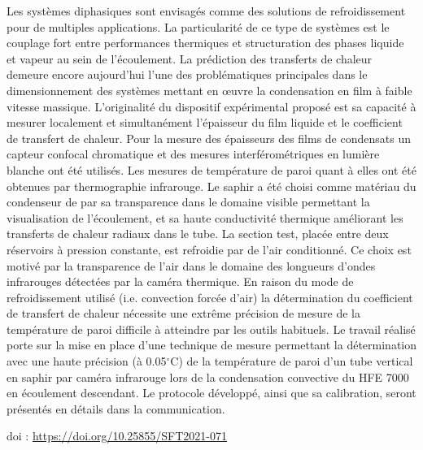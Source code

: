 {\normalsize
Les systèmes diphasiques sont envisagés comme des solutions de refroidissement pour de multiples applications. La particularité de ce type de systèmes est le couplage fort entre performances thermiques et structuration des phases liquide et vapeur au sein de l'écoulement. La prédiction des transferts de chaleur demeure encore aujourd'hui l'une des problématiques principales dans le dimensionnement des systèmes mettant en œuvre la condensation en film à faible vitesse massique. L'originalité du dispositif expérimental proposé est sa capacité à mesurer localement et simultanément l'épaisseur du film liquide et le coefficient de transfert de chaleur. Pour la mesure des épaisseurs des films de condensats un capteur confocal chromatique et des mesures interférométriques en lumière blanche ont été utilisés. Les mesures de température de paroi quant à elles ont été obtenues par thermographie infrarouge. Le saphir a été choisi comme matériau du condenseur de par sa transparence dans le domaine visible permettant la visualisation de l'écoulement, et sa haute conductivité thermique améliorant les transferts de chaleur radiaux dans le tube. La section test, placée entre deux réservoirs à pression constante, est refroidie par de l'air conditionné. Ce choix est motivé par la transparence de l'air dans le domaine des longueurs d'ondes infrarouges détectées par la caméra thermique. En raison du mode de refroidissement utilisé (i.e. convection forcée d'air) la détermination du coefficient de transfert de chaleur nécessite une extrême précision de mesure de la température de paroi difficile à atteindre par les outils habituels. Le travail réalisé porte sur la mise en place d'une technique de mesure permettant la détermination avec une haute précision (à 0.05$^{\circ}$C) de la température de paroi d'un tube vertical en saphir par caméra infrarouge lors de la condensation convective du HFE 7000 en écoulement descendant. Le protocole développé, ainsi que sa calibration, seront présentés en détails dans la communication.

 \vfill doi : \url{https://doi.org/10.25855/SFT2021-071}

}
 
